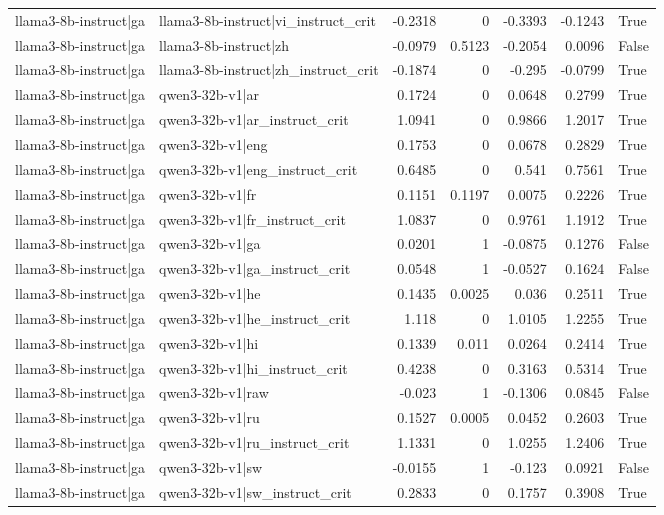 \begin{table}
\begin{tabular}{l l r r r r l}
llama3-8b-instruct|ga & llama3-8b-instruct|vi_instruct_crit & -0.2318 & 0 & -0.3393 & -0.1243 & True \\
llama3-8b-instruct|ga & llama3-8b-instruct|zh & -0.0979 & 0.5123 & -0.2054 & 0.0096 & False \\
llama3-8b-instruct|ga & llama3-8b-instruct|zh_instruct_crit & -0.1874 & 0 & -0.295 & -0.0799 & True \\
llama3-8b-instruct|ga & qwen3-32b-v1|ar & 0.1724 & 0 & 0.0648 & 0.2799 & True \\
llama3-8b-instruct|ga & qwen3-32b-v1|ar_instruct_crit & 1.0941 & 0 & 0.9866 & 1.2017 & True \\
llama3-8b-instruct|ga & qwen3-32b-v1|eng & 0.1753 & 0 & 0.0678 & 0.2829 & True \\
llama3-8b-instruct|ga & qwen3-32b-v1|eng_instruct_crit & 0.6485 & 0 & 0.541 & 0.7561 & True \\
llama3-8b-instruct|ga & qwen3-32b-v1|fr & 0.1151 & 0.1197 & 0.0075 & 0.2226 & True \\
llama3-8b-instruct|ga & qwen3-32b-v1|fr_instruct_crit & 1.0837 & 0 & 0.9761 & 1.1912 & True \\
llama3-8b-instruct|ga & qwen3-32b-v1|ga & 0.0201 & 1 & -0.0875 & 0.1276 & False \\
llama3-8b-instruct|ga & qwen3-32b-v1|ga_instruct_crit & 0.0548 & 1 & -0.0527 & 0.1624 & False \\
llama3-8b-instruct|ga & qwen3-32b-v1|he & 0.1435 & 0.0025 & 0.036 & 0.2511 & True \\
llama3-8b-instruct|ga & qwen3-32b-v1|he_instruct_crit & 1.118 & 0 & 1.0105 & 1.2255 & True \\
llama3-8b-instruct|ga & qwen3-32b-v1|hi & 0.1339 & 0.011 & 0.0264 & 0.2414 & True \\
llama3-8b-instruct|ga & qwen3-32b-v1|hi_instruct_crit & 0.4238 & 0 & 0.3163 & 0.5314 & True \\
llama3-8b-instruct|ga & qwen3-32b-v1|raw & -0.023 & 1 & -0.1306 & 0.0845 & False \\
llama3-8b-instruct|ga & qwen3-32b-v1|ru & 0.1527 & 0.0005 & 0.0452 & 0.2603 & True \\
llama3-8b-instruct|ga & qwen3-32b-v1|ru_instruct_crit & 1.1331 & 0 & 1.0255 & 1.2406 & True \\
llama3-8b-instruct|ga & qwen3-32b-v1|sw & -0.0155 & 1 & -0.123 & 0.0921 & False \\
llama3-8b-instruct|ga & qwen3-32b-v1|sw_instruct_crit & 0.2833 & 0 & 0.1757 & 0.3908 & True \\

\end{tabular}
\end{table}
